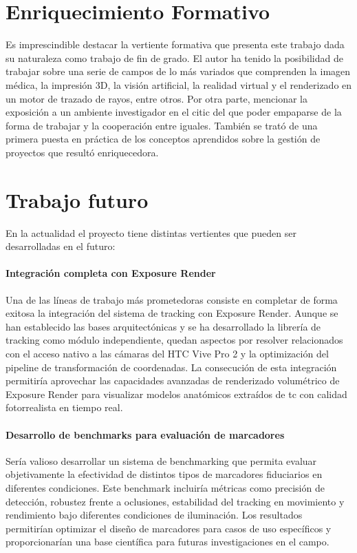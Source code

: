 \section{Enriquecimiento Formativo}
Es imprescindible destacar la vertiente formativa que presenta este trabajo dada su naturaleza como trabajo de fin de grado. El autor ha tenido la posibilidad de trabajar sobre una serie de campos de lo más variados que comprenden la imagen médica, la impresión 3D, la visión artificial, la realidad virtual y el renderizado en un motor de trazado de rayos, entre otros. Por otra parte, mencionar la exposición a un ambiente investigador en el \acrshort{citic} del que poder empaparse de la forma de trabajar y la cooperación entre iguales. También se trató de una primera puesta en práctica de los conceptos aprendidos sobre la gestión de proyectos que resultó enriquecedora.
\section{Trabajo futuro}
En la actualidad el proyecto tiene distintas vertientes que pueden ser desarrolladas en el futuro:

\paragraph{Integración completa con Exposure Render}
Una de las líneas de trabajo más prometedoras consiste en completar de forma exitosa la integración del sistema de tracking con Exposure Render. Aunque se han establecido las bases arquitectónicas y se ha desarrollado la librería de tracking como módulo independiente, quedan aspectos por resolver relacionados con el acceso nativo a las cámaras del HTC Vive Pro 2 y la optimización del pipeline de transformación de coordenadas. La consecución de esta integración permitiría aprovechar las capacidades avanzadas de renderizado volumétrico de Exposure Render para visualizar modelos anatómicos extraídos de \acrshort{tc} con calidad fotorrealista en tiempo real.

\paragraph{Desarrollo de benchmarks para evaluación de marcadores}
Sería valioso desarrollar un sistema de benchmarking que permita evaluar objetivamente la efectividad de distintos tipos de marcadores fiduciarios en diferentes condiciones. Este benchmark incluiría métricas como precisión de detección, robustez frente a oclusiones, estabilidad del tracking en movimiento y rendimiento bajo diferentes condiciones de iluminación. Los resultados permitirían optimizar el diseño de marcadores para casos de uso específicos y proporcionarían una base científica para futuras investigaciones en el campo.

